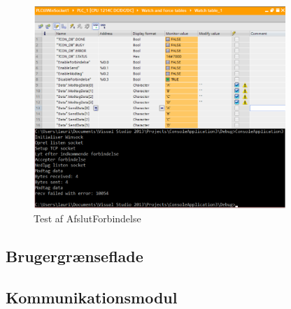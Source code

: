 \begin{figure}[H] %
	\centering
	\includegraphics[width=0.85\textwidth]{Test/ModultestStyringsenhed/AfslutForbindelse}
	\caption{Test af AfslutForbindelse}
	\label{fig:AfslutForbindelse}
\end{figure}

\subsection{Brugergrænseflade}


\subsection{Kommunikationsmodul}